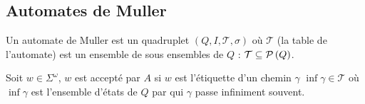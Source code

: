 \subsection{Automates de Muller}

\begin{definition}
	Un automate de Muller est un quadruplet $(Q,I, \mathcal T, \sigma)$ où $\mathcal T$ (la table de l'automate) est un ensemble de sous ensembles
	de $Q$ : $\mathcal T \subseteq \mathcal{P}\left(Q\right)$.

	Soit $w \in \Sigma^{\omega}$, $w$ est accepté par $A$ si $w$ est l'étiquette d'un chemin $\gamma$ \tq $\inf {\gamma} \in \mathcal T$ où
	$\inf {\gamma}$ est l'ensemble d'états de $Q$ par qui $\gamma$ passe infiniment souvent.

\end{definition}
